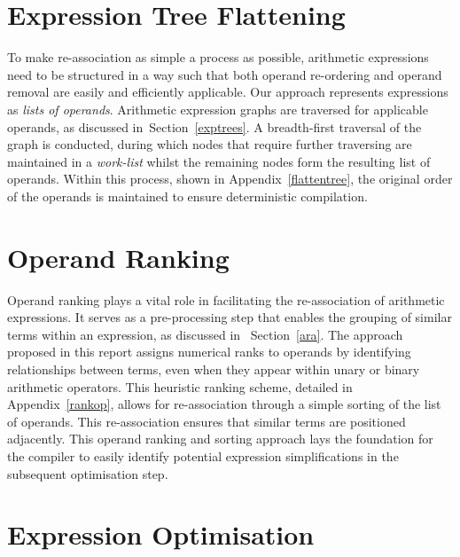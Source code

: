 \documentclass[12pt,openany,a4paper]{book}
\newcommand{\secn}[1] {Section~\ref{#1}}	%
\newcommand{\app}[1]  {Appendix~\ref{#1}}   %
\begin{document}
\section{Expression Tree Flattening}
\label{flattening}

To make re-association as simple a process as possible, arithmetic expressions
need to be structured in a way such that both operand re-ordering and operand
removal are easily and efficiently applicable. Our approach represents
expressions as \emph{lists of operands}. Arithmetic expression graphs are
traversed for applicable operands, as discussed in~\secn{exptrees}. A
breadth-first traversal of the graph is conducted, during which nodes that
require further traversing are maintained in a \emph{work-list} whilst the 
remaining nodes form the resulting list of operands. Within this process,
shown in \app{flattentree}, the original order of the operands is maintained
to ensure deterministic compilation.

\section{Operand Ranking}
\label{oprank}

Operand ranking plays a vital role in facilitating the re-association of 
arithmetic expressions. It serves as a pre-processing step that enables the 
grouping of similar terms within an expression, as discussed in ~\secn{ara}.
The approach proposed in this report assigns numerical ranks to operands by
identifying relationships between terms, even when they appear within unary
or binary arithmetic operators. This heuristic ranking scheme, detailed in
\app{rankop}, allows for re-association through a simple sorting of the list
of operands. This re-association ensures that similar terms are positioned
adjacently. This operand ranking and sorting approach lays the foundation
for the compiler to easily identify potential expression simplifications in
the subsequent optimisation step.

\section{Expression Optimisation}
\label{optimise}
\end{document}
